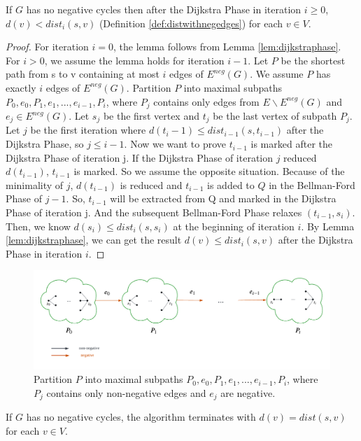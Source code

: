 \documentclass[11pt]{article}
\newcommand{\eneg}{E^{neg}}
\begin{document}
\begin{lemma}
    If $G$ has no negative cycles then after the Dijkstra Phase in iteration $i \ge 0$, $d(v) < dist_i(s, v)$ (Definition \ref{def:distwithnegedges}) for each $v \in V$. 
\end{lemma}
\begin{proof}
    For iteration $i = 0$, the lemma follows from Lemma \ref{lem:dijkstraphase}. For $i > 0$, we assume the lemma holds for iteration $i - 1$. Let $P$ be the shortest path from s to v containing at most $i$ edges of $\eneg(G)$. We assume $P$ has exactly $i$ edges of $\eneg(G)$. Partition $P$ into maximal subpaths $P_0, e_0, P_1, e_1, ..., e_{i-1}, P_i$, where $P_j$ contains only edges from $E \backslash \eneg(G)$ and $e_j \in \eneg(G)$. Let $s_j$ be the first vertex and $t_j$ be the last vertex of subpath $P_j$. Let $j$ be the first iteration where $d(t_i-1) \le dist_{i-1}(s, t_{i-1})$ after the Dijkstra Phase, so $j \le i-1$. Now we want to prove $t_{i-1}$ is marked after the Dijkstra Phase of iteration j. If the Dijkstra Phase of iteration $j$ reduced $d(t_{i-1})$, $t_{i-1}$ is marked. So we assume the opposite situation. Because of the minimality of $j$, $d(t_{i-1})$ is reduced and $t_{i-1}$ is added to $Q$ in the Bellman-Ford Phase of $j-1$. So, $t_{i-1}$ will be extracted from Q and marked in the Dijkstra Phase of iteration j. And the subsequent Bellman-Ford Phase relaxes $(t_{i-1}, s_i)$. Then, we know $d(s_i) \le dist_i(s, s_i)$ at the beginning of iteration $i$. By Lemma \ref{lem:dijkstraphase}, we can get the result $d(v) \le dist_i(s, v)$ after the Dijkstra Phase in iteration $i$.
\end{proof}

\begin{figure}[ht]
    \centering
    \includegraphics[width=0.9\linewidth]{images/partition.pdf}
    \caption{Partition $P$ into maximal subpaths $P_0, e_0, P_1, e_1, ..., e_{i-1}, P_i$, where $P_j$ contains only non-negative edges and $e_j$ are negative.}
\end{figure}

\begin{corollary}
    If $G$ has no negative cycles, the algorithm terminates with $d(v) = dist(s, v)$ for each $v \in V$.
\end{corollary}
\end{document}

